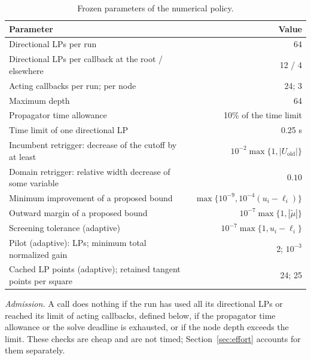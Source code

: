 \begin{table}[htbp]
\centering
\small
\begin{tabular}{@{}lr@{}}
\toprule
Parameter & Value\\
\midrule
Directional LPs per run & 64\\
Directional LPs per callback at the root / elsewhere & 12 / 4\\
Acting callbacks per run; per node & 24; 3\\
Maximum depth & 64\\
Propagator time allowance & 10\% of the time limit\\
Time limit of one directional LP & 0.25 s\\
Incumbent retrigger: decrease of the cutoff by at least & $10^{-2}\max\{1,|U_{\mathrm{old}}|\}$\\
Domain retrigger: relative width decrease of some variable & $0.10$\\
Minimum improvement of a proposed bound & $\max\{10^{-9},10^{-4}(u_i-\ell_i)\}$\\
Outward margin of a proposed bound & $10^{-7}\max\{1,|\tilde\mu|\}$\\
Screening tolerance (adaptive) & $10^{-7}\max\{1,u_i-\ell_i\}$\\
Pilot (adaptive): LPs; minimum total normalized gain & 2; $10^{-3}$\\
Cached LP points (adaptive); retained tangent points per square & 24; 25\\
\bottomrule
\end{tabular}
\caption{Frozen parameters of the numerical policy.}
\label{tab:policy-parameters}
\end{table}

\emph{Admission.} A call does nothing if the run has used all its directional
LPs or reached its limit of acting callbacks, defined below, if the
propagator time allowance or the solve deadline is exhausted, or if the
node depth exceeds the limit. These checks are cheap and are not timed;
Section~\ref{sec:effort} accounts for them separately.

